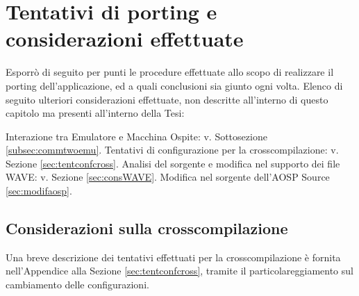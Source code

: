 \chapter{Tentativi di porting e considerazioni effettuate}
\minitoc\mtcskip

Esporrò di seguito per punti le procedure effettuate allo scopo di realizzare il
porting dell'applicazione, ed a quali conclusioni sia giunto ogni volta. 
Elenco di seguito ulteriori considerazioni effettuate, non descritte all'interno
di questo capitolo ma presenti all'interno della Tesi:
\begin{itemize}
\diam Interazione tra Emulatore e Macchina Ospite: v. Sottosezione \vref{subsec:commtwoemu}.
\diam Tentativi di configurazione per la crosscompilazione: v. Sezione \vref{sec:tentconfcross}.
\diam Analisi del sorgente e modifica nel supporto dei file WAVE: v. Sezione \vref{sec:consWAVE}.
\diam Modifica nel sorgente dell'AOSP Source \vref{sec:modifaosp}.
\end{itemize}

\section{Considerazioni sulla crosscompilazione}\label{sec:conscrossocmp}
Una breve descrizione dei tentativi effettuati per la crosscompilazione
è fornita nell'Appendice alla Sezione \vref{sec:tentconfcross}, tramite il
particolareggiamento sul cambiamento delle configurazioni.

